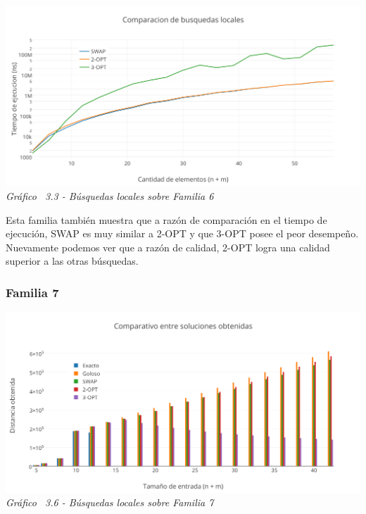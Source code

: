 \vspace*{0.3cm} \vspace*{0.3cm}
  \begin{center}
 \includegraphics[scale=0.5]{./EJ3/comparacionbusquedaslocalessinorden.png}
 {            \textit{Gráfico \ 3.3 - Búsquedas locales sobre Familia 6}}
  \end{center}
  \vspace*{0.3cm}



Esta familia también muestra que a raz\'on de comparación en el tiempo de ejecución, SWAP es muy similar a 2-OPT y que 3-OPT posee el peor desempeño. Nuevamente podemos ver que a razón de calidad, 2-OPT logra una calidad superior a las otras búsquedas.



\subsubsection*{Familia 7}

  \vspace*{0.3cm} \vspace*{0.3cm}
  \begin{center}
 \includegraphics[scale=0.5]{./EJ3/comparacionbusquedaslocalessolucionanillos.png}
 {            \textit{Gráfico \ 3.6 - Búsquedas locales sobre Familia 7}}
  \end{center}
  \vspace*{0.3cm}

